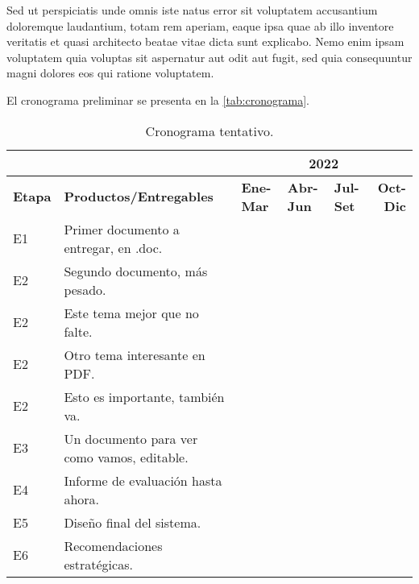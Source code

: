 Sed ut perspiciatis unde omnis iste natus error sit voluptatem accusantium doloremque laudantium, totam rem aperiam, eaque ipsa quae ab illo inventore veritatis et quasi architecto beatae vitae dicta sunt explicabo. Nemo enim ipsam voluptatem quia voluptas sit aspernatur aut odit aut fugit, sed quia consequuntur magni dolores eos qui ratione voluptatem. 

El cronograma preliminar se presenta en la \autoref{tab:cronograma}.
	
\begin{table}[h]
	\centering
	\caption{Cronograma tentativo.}
	{\color{grayblack}
	\begin{tabular}{p{2.2em}p{14em}lllr}
		\multicolumn{1}{l}{} & \multicolumn{1}{r}{} & \multicolumn{4}{c}{\textbf{2022}} \\
		\midrule
		\textbf{Etapa} & \textbf{Productos/Entregables} & \multicolumn{1}{p{4.055em}}{\textbf{Ene-Mar}} & \multicolumn{1}{p{4.055em}}{\textbf{Abr-Jun}} & \multicolumn{1}{p{4.055em}}{\textbf{Jul-Set}} & \multicolumn{1}{p{4.055em}}{\textbf{Oct-Dic}} \\
		\midrule
		E1    & Primer documento a entregar, en .doc. &       & \cellcolor[rgb]{ .718,  .871,  .91} &       &  \\
		E2    & Segundo documento, más pesado. & \cellcolor[rgb]{ .776,  .89,  .859} &       &       &  \\
		E2    & Este tema mejor que no falte. &       & \cellcolor[rgb]{ .776,  .89,  .859} &       &  \\
		E2    & Otro tema interesante en PDF. &       &       & \cellcolor[rgb]{ .776,  .89,  .859} &  \\
		E2    & Esto es importante, también va. &       &       & \cellcolor[rgb]{ .776,  .89,  .859} &  \\
		E3    & Un documento para ver como vamos, editable. &       & \cellcolor[rgb]{ .722,  .804,  .894} &       &  \\
		E4    & Informe de evaluación hasta ahora. &       & \cellcolor[rgb]{ .722,  .804,  .894} &       &  \\
		E5    & Diseño final del sistema. &       &       &       & \cellcolor[rgb]{ .722,  .804,  .894} \\
		E6    & Recomendaciones estratégicas. &       &       &       & \cellcolor[rgb]{ .722,  .804,  .894} \\
		\bottomrule
	\end{tabular}}
	\label{tab:cronograma}
\end{table}%

